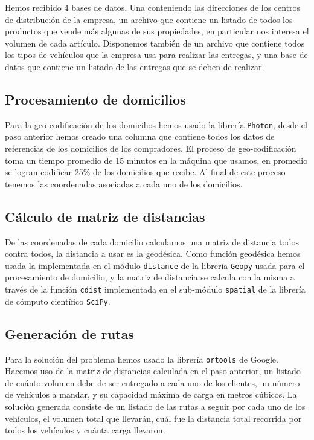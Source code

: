 \documentclass[journal]{IEEEtran}
\begin{document}
            Hemos recibido 4 bases de datos. Una conteniendo las direcciones de los centros de distribución de la empresa, un archivo que contiene un listado de todos los productos que vende más algunas de sus propiedades, en particular nos interesa el volumen de cada artículo. Disponemos también de un archivo que contiene todos los tipos de vehículos que la empresa usa para realizar las entregas, y una base de datos que contiene un listado de las entregas que se deben de realizar.
            
        \subsection{Procesamiento de domicilios} \label{stage 2}
        
            Para la geo-codificación de los domicilios hemos usado la librería \texttt{Photon}, desde el paso anterior hemos creado una columna que contiene todos los datos de referencias de los domicilios de los compradores. El proceso de geo-codificación toma un tiempo promedio de 15 minutos en la máquina que usamos, en promedio se logran codificar 25\% de los domicilios que recibe. Al final de este proceso tenemos las coordenadas asociadas a cada uno de los domicilios.

        \subsection{Cálculo de matriz de distancias} \label{stage 3}
            
            De las coordenadas de cada domicilio calculamos una matriz de distancia todos contra todos, la distancia a usar es la geodésica. Como función geodésica hemos usada la implementada en el módulo \texttt{distance} de la librería \texttt{Geopy} usada para el procesamiento de domicilio, y la matriz de distancia se calcula con la misma a través de la función \texttt{cdist} implementada en el sub-módulo \texttt{spatial} de la librería de cómputo científico \texttt{SciPy}.

        \subsection{Generación de rutas} \label{stage 4}
        
            Para la solución del problema hemos usado la librería \texttt{ortools} de Google. Hacemos uso de la matriz de distancias calculada en el paso anterior, un listado de cuánto volumen debe de ser entregado a cada uno de los clientes, un número de vehículos a mandar, y su capacidad máxima de carga en metros cúbicos. La solución generada consiste de un listado de las rutas a seguir por cada uno de los vehículos, el volumen total que llevarán, cuál fue la distancia total recorrida por todos los vehículos y cuánta carga llevaron.
\end{document}
